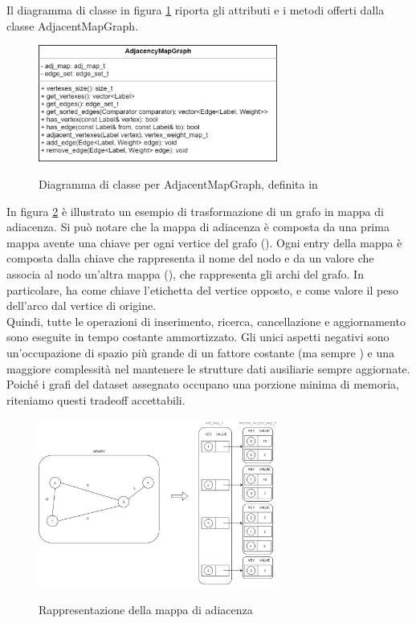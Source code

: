 \noindent Il diagramma di classe in figura \ref{fig:AdjMapGraph Class} riporta gli attributi e i metodi offerti dalla classe AdjacentMapGraph.

\begin{figure}[h]
	\caption{Diagramma di classe per AdjacentMapGraph, definita in }
	\centering
	\includegraphics[width=0.7\textwidth]{./images/AdjancencyMapGrapClass.png}
	\label{fig:AdjMapGraph Class}
\end{figure}

\noindent In figura \ref{fig:AdjMapGraph Abstract} è illustrato un esempio di trasformazione di un grafo in mappa di adiacenza. Si può notare che la mappa di adiacenza è composta da una prima mappa avente una chiave per ogni vertice del grafo (). Ogni entry della mappa è composta dalla chiave che rappresenta il nome del nodo e da un valore che associa al nodo un'altra mappa (), che rappresenta gli archi del grafo.
In particolare,  ha come chiave l'etichetta del vertice opposto, e come valore il peso dell'arco dal vertice di origine. \\

\noindent Quindi, tutte le operazioni di inserimento, ricerca, cancellazione e aggiornamento sono eseguite in tempo costante ammortizzato. Gli unici aspetti negativi sono un'occupazione di spazio più grande di un fattore costante (ma sempre \complexityNPlusM{}) e una maggiore complessità nel mantenere le strutture dati ausiliarie sempre aggiornate. Poiché i grafi del dataset assegnato occupano una porzione minima di memoria, riteniamo questi tradeoff accettabili. \\

\begin{figure}[h]
	\caption{Rappresentazione della mappa di adiacenza}
	\centering
	\includegraphics[width=0.7\textwidth]{./images/AdjMapGraphAbstract.png}
	\label{fig:AdjMapGraph Abstract}
\end{figure}

